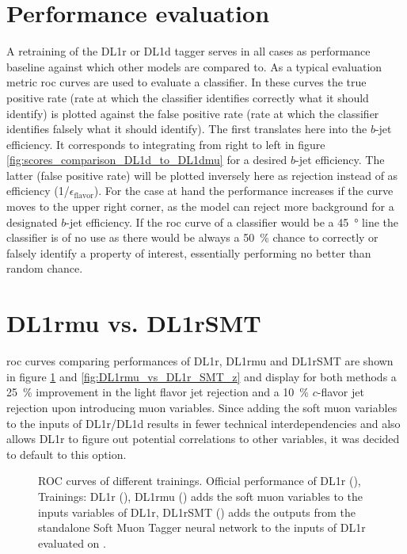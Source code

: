 \section{Performance evaluation}
A retraining of the DL1r or DL1d tagger serves in all cases as performance baseline against which other models are compared to. As a typical evaluation metric \ac{roc} curves are used to evaluate a classifier. In these curves the true positive rate (rate at which the classifier identifies correctly what it should identify) is plotted against the false positive rate (rate at which the classifier identifies falsely what it should identify). The first translates here into the $b$-jet efficiency. It corresponds to integrating from right to left in figure \ref{fig:scores_comparison_DL1d_to_DL1dmu} for a desired $b$-jet efficiency. The latter (false positive rate) will be plotted inversely here as rejection instead of as efficiency (1/$\epsilon_\mathrm{flavor}$). For the case at hand the performance increases if the curve moves to the upper right corner, as the model can reject more background for a designated $b$-jet efficiency. If the \ac{roc} curve of a classifier would be a \qty{45}{\degree} line the classifier is of no use as there would be always a \qty{50}{\percent} chance to correctly or falsely identify a property of interest, essentially performing no better than random chance.

\section{DL1rmu vs. DL1rSMT}
\ac{roc} curves comparing performances of DL1r, DL1rmu and DL1rSMT are shown in figure \ref{fig:DL1rmu_vs_DL1r_SMT_tt} and \ref{fig:DL1rmu_vs_DL1r_SMT_z} and display for both methods a \qty{25}{\percent} improvement in the light flavor jet rejection and a \qty{10}{\percent} $c$-flavor jet rejection upon introducing muon variables. Since adding the soft muon variables to the inputs of DL1r/DL1d results in fewer technical interdependencies and also allows DL1r to figure out potential correlations to other variables, it was decided to default to this option.

\begin{figure}[]
  \centering
  \caption{ROC curves of different trainings. Official performance of DL1r (), Trainings: DL1r (), DL1rmu () adds the soft muon variables to the inputs variables of DL1r,  DL1rSMT () adds the outputs from the standalone Soft Muon Tagger neural network to the inputs of DL1r evaluated on \ttbar. }
  \label{fig:DL1rmu_vs_DL1r_SMT_tt}
\end{figure}

